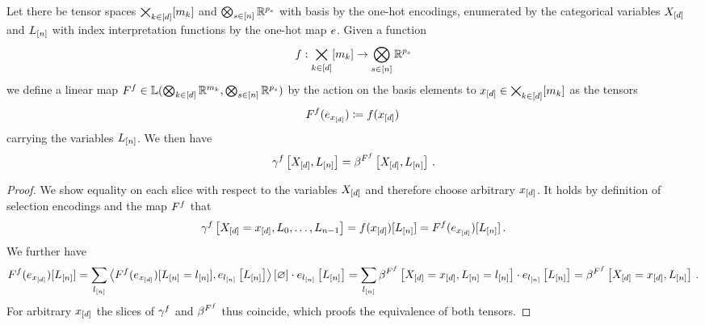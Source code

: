 \begin{theorem}
    \label{the:selectionToBasisEncoding}
    Let there be tensor spaces $\bigtimes_{k\in[d]}[m_{k}]$ and $\bigotimes_{s\in[n]}\mathbb{R}^{p_{s}}$ with basis by the one-hot encodings, enumerated by the categorical variables $X_{[d]}$ and $L_{[n]}$ with index interpretation functions by the one-hot map $e$.
    Given a function
    \begin{align*}
        f : \bigtimes_{k\in[d]}[m_{k}] \rightarrow \bigotimes_{s\in[n]}\mathbb{R}^{p_{s}}
    \end{align*}
    we define a linear map $F^{f}\in\mathbb{L}(\bigotimes_{k\in[d]} \mathbb{R}^{m_{k}},\bigotimes_{s\in[n]}\mathbb{R}^{p_{s}})$ by the action on the basis elements to $x_{[d]}\in\bigtimes_{k\in[d]}[m_{k}]$ as the tensors %
    \begin{align*}
        F^{f}(e_{x_{[d]}}) \coloneqq f(x_{[d]}) \,
    \end{align*}
    carrying the variables $L_{[n]}$.
    We then have
    \begin{align*}
        \gamma^{f}\left[X_{[d]},L_{[n]}\right]
        = \beta^{F^{f}}\left[X_{[d]},L_{[n]}\right] \, .
    \end{align*}
\end{theorem}
\begin{proof}
    We show equality on each slice with respect to the variables $X_{[d]}$ and therefore choose arbitrary $x_{[d]}$. %
    It holds by definition of selection encodings and the map $F^{f}$ that
    \begin{align*}
        \gamma^{f}\left[X_{[d]}=x_{[d]},L_{0},\ldots,L_{n-1}\right]
        = f(x_{[d]})[L_{[n]}]
        = F^{f}(e_{x_{[d]}})[L_{[n]}] \, .
    \end{align*}
    We further have
    \begin{align*}
        F^{f}(e_{x_{[d]}})[L_{[n]}]
        = \sum_{l_{[n]}} \left\langle F^{f}(e_{x_{[d]}})[L_{[n]}=l_{[n]}],e_{l_{[n]}}\left[L_{[n]}\right]\right\rangle \left[ \varnothing \right] \cdot e_{l_{[n]}}\left[L_{[n]}\right]
        = \sum_{l_{[n]}} \beta^{F^{f}}\left[X_{[d]}=x_{[d]},L_{[n]}=l_{[n]}\right] \cdot e_{l_{[n]}}\left[L_{[n]}\right]
        = \beta^{F^{f}}\left[X_{[d]}=x_{[d]},L_{[n]}\right] \, .
    \end{align*}
    For arbitrary $x_{[d]}$ the slices of $\gamma^{f}$ and $\beta^{F^{f}}$ thus coincide, which proofs the equivalence of both tensors.
\end{proof}

